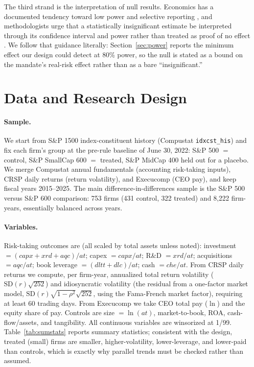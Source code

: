 \documentclass[12pt]{article}
\begin{document}
The third strand is the interpretation of null results. Economics has a documented tendency
toward low power and selective reporting \citep{ioannidis2017}, and methodologists urge that a
statistically insignificant estimate be interpreted through its confidence interval and power
rather than treated as proof of no effect \citep{abadie2020}. We follow that guidance literally:
Section~\ref{sec:power} reports the minimum effect our design could detect at 80\% power, so the
null is stated as a bound on the mandate's real-risk effect rather than as a bare
``insignificant.''

\section{Data and Research Design}\label{sec:data}
\paragraph{Sample.} We start from S\&P 1500 index-constituent history (Compustat
\texttt{idxcst\_his}) and fix each firm's group at the pre-rule baseline of June 30, 2022:
S\&P 500 $=$ control, S\&P SmallCap 600 $=$ treated, S\&P MidCap 400 held out for a placebo.
We merge Compustat annual fundamentals (accounting risk-taking inputs), CRSP daily returns
(return volatility), and Execucomp (CEO pay), and keep fiscal years 2015--2025. The main
difference-in-differences sample is the S\&P 500 versus S\&P 600 comparison: 753 firms (431
control, 322 treated) and 8{,}222 firm-years, essentially balanced across years.

\paragraph{Variables.} Risk-taking outcomes are (all scaled by total assets unless noted):
investment $=(capx+xrd+aqc)/at$; capex $=capx/at$; R\&D $=xrd/at$; acquisitions $=aqc/at$;
book leverage $=(dltt+dlc)/at$; cash $=che/at$. From CRSP daily returns we compute, per
firm-year, annualized total return volatility ($\text{SD}(r)\sqrt{252}$) and idiosyncratic
volatility (the residual from a one-factor market model, $\text{SD}(r)\sqrt{1-\rho^2}\sqrt{252}$,
using the Fama-French market factor), requiring at least 60 trading days. From Execucomp we take
CEO total pay ($\ln$) and the equity share of pay. Controls are size $=\ln(at)$, market-to-book,
ROA, cash-flow/assets, and tangibility. All continuous variables are winsorized at 1/99.
Table~\ref{tab:sumstats} reports summary statistics; consistent with the design, treated
(small) firms are smaller, higher-volatility, lower-leverage, and lower-paid than controls,
which is exactly why parallel trends must be checked rather than assumed.
\end{document}
